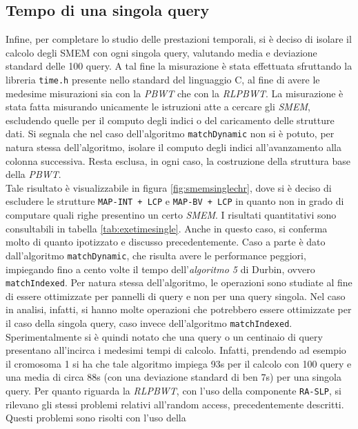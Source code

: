 \subsection{Tempo di una singola query}
Infine, per completare lo studio delle prestazioni temporali, si è deciso di
isolare il calcolo degli SMEM con ogni singola query, valutando media e
deviazione standard delle 100 query. A tal fine la misurazione è stata
effettuata sfruttando la libreria \texttt{time.h} presente nello standard del
linguaggio C, al fine di avere le medesime misurazioni sia con la \textit{PBWT}
che con la \textit{RLPBWT}. La misurazione è stata fatta misurando unicamente le
istruzioni atte a cercare gli \textit{SMEM}, 
escludendo quelle per il computo degli indici o del caricamento delle strutture
dati.
Si segnala che nel caso dell'algoritmo \texttt{matchDynamic} non si è
potuto, per natura stessa dell'algoritmo, isolare il computo degli indici
all'avanzamento alla colonna successiva. Resta esclusa, in ogni caso, la
costruzione della struttura base della \textit{PBWT}.
\\
Tale risultato è visualizzabile in figura
\ref{fig:smemsinglechr}, dove si è deciso di escludere le strutture
\texttt{MAP-INT + LCP} e \texttt{MAP-BV + LCP} in quanto non in grado di
computare quali righe presentino un certo \textit{SMEM}. I risultati
quantitativi sono consultabili in tabella \ref{tab:exetimesingle}. Anche in
questo caso, 
si conferma molto di quanto ipotizzato e discusso precedentemente. Caso a parte
è dato dall'algoritmo \texttt{matchDynamic}, che risulta avere le performance
peggiori, impiegando fino a cento volte il tempo dell'\textit{algoritmo 5} di
Durbin, ovvero \texttt{matchIndexed}. Per natura stessa dell'algoritmo, 
le operazioni sono studiate al fine di essere ottimizzate per pannelli di query
e non per una query singola. Nel caso in analisi, infatti, si hanno molte
operazioni che potrebbero essere ottimizzate per il caso della singola
query, caso invece dell'algoritmo \texttt{matchIndexed}. Sperimentalmente si è
quindi notato che una query o un centinaio di query presentano all'incirca i
medesimi tempi di calcolo. Infatti, prendendo ad esempio il cromosoma 1 si ha
che tale 
algoritmo impiega 93s per il calcolo con 100 query e una media di circa 88s (con
una deviazione standard di ben 7s) per
una singola query. Per quanto riguarda la \textit{RLPBWT}, con l'uso della
componente \texttt{RA-SLP}, si rilevano gli stessi problemi relativi all'random
access, precedentemente descritti. Questi problemi sono risolti con l'uso della
